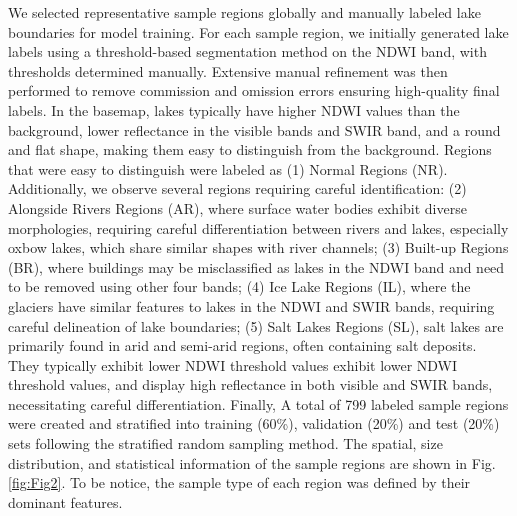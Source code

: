 \documentclass[preprint,12pt,authoryear]{elsarticle}
\begin{document}
We selected representative sample regions globally and manually labeled lake boundaries for model training. For each sample region, we initially generated lake labels using a threshold-based segmentation method on the NDWI band, with thresholds determined manually. Extensive manual refinement was then performed to remove commission and omission errors ensuring high-quality final labels. In the basemap, lakes typically have higher NDWI values than the background, lower reflectance in the visible bands and SWIR band, and a round and flat shape, making them easy to distinguish from the background. Regions that were easy to distinguish were labeled as (1) Normal Regions (NR). Additionally, we observe several regions requiring careful identification: (2) Alongside Rivers Regions (AR), where surface water bodies exhibit diverse morphologies, requiring careful differentiation between rivers and lakes, especially oxbow lakes, which share similar shapes with river channels; (3) Built-up Regions (BR), where buildings may be misclassified as lakes in the NDWI band and need to be removed using other four bands; (4) Ice Lake Regions (IL), where the glaciers have similar features to lakes in the NDWI and SWIR bands, requiring careful delineation of lake boundaries; (5) Salt Lakes Regions (SL), salt lakes are primarily found in arid and semi-arid regions, often containing salt deposits. They typically exhibit lower NDWI threshold values exhibit lower NDWI threshold values, and display high reflectance in both visible and SWIR bands, necessitating careful differentiation. Finally, A total of 799 labeled sample regions were created and stratified into training (60\%), validation (20\%) and test (20\%) sets following the stratified random sampling method. The spatial, size distribution, and statistical information of the sample regions are shown in Fig. \ref{fig:Fig2}. To be notice, the sample type of each region was defined by their dominant features.
\end{document}
